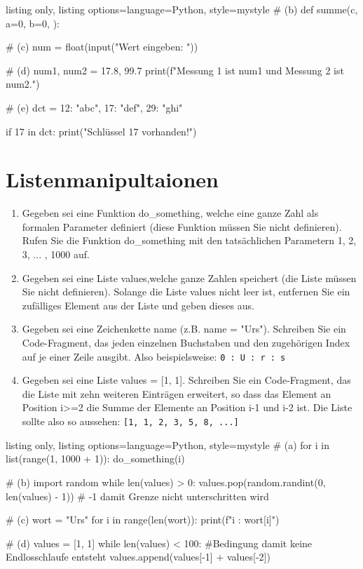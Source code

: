 \documentclass[11pt, oneside]{book}
\begin{document}
\begin{tcblisting}{listing only, listing options={language=Python, style=mystyle}}
# (b)
def summe(c, a=0, b=0, ):

# (c)
num = float(input("Wert eingeben: "))

# (d)
num1, num2 = 17.8, 99.7
print(f"Messung 1 ist {num1} und Messung 2 ist {num2}.")

# (e)
dct = {12: "abc", 17: "def", 29: "ghi"}

if 17 in dct:
    print("Schlüssel 17 vorhanden!")
\end{tcblisting}

\newpage
\section{Listenmanipultaionen}

\begin{enumerate}[label=(\alph*)]
    \item Gegeben sei eine Funktion do\_something, welche eine ganze Zahl als formalen Parameter definiert (diese Funktion müssen Sie nicht definieren). Rufen Sie die Funktion do\_something mit den tatsächlichen Parametern 1, 2, 3, ... , 1000 auf.
    \item Gegeben sei eine Liste values,welche ganze Zahlen speichert (die Liste müssen Sie nicht definieren). Solange die Liste values nicht leer ist, entfernen Sie ein zufälliges Element aus der Liste und geben dieses aus.
    \item Gegeben sei eine Zeichenkette name (z.B. name = "Urs"). Schreiben Sie ein Code-Fragment, das jeden einzelnen Buchstaben und den zugehörigen Index auf je einer Zeile ausgibt. Also beispielsweise: \newline
    \texttt{0 : U  : r  : s}
    \item Gegeben sei eine Liste values = [1, 1]. Schreiben Sie ein Code-Fragment, das die Liste mit zehn weiteren Einträgen erweitert, so dass das Element an Position i>=2 die Summe der Elemente an Position i-1 und i-2 ist. Die Liste sollte also so aussehen: \texttt{[1, 1, 2, 3, 5, 8, ...]}
\end{enumerate}


\begin{tcblisting}{listing only, listing options={language=Python, style=mystyle}}
# (a)
for i in list(range(1, 1000 + 1)):
    do_something(i)

# (b)
import random
while len(values) > 0:
    values.pop(random.randint(0, len(values) - 1)) # -1 damit Grenze nicht unterschritten wird

# (c)
wort = "Urs"
for i in range(len(wort)):
    print(f"{i} : {wort[i]}")

# (d)
values = [1, 1]
while len(values) < 100: #Bedingung damit keine Endlosschlaufe entsteht
    values.append(values[-1] + values[-2])
\end{tcblisting}
\end{document}
